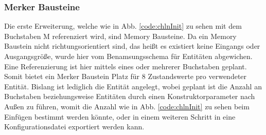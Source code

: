 \subsubsection{Merker Bausteine}
Die erste Erweiterung, welche wie in Abb. \ref{code:chlnInit} zu sehen mit dem Buchstaben M referenziert wird, sind Memory Bausteine. Da ein Memory Baustein nicht richtungsorientiert sind, das heißt es existiert keine Eingangs oder Ausgangsgröße, wurde hier vom Benamsungsschema für Entitäten  abgewichen. Eine Referenzierung ist hier mittels eines oder mehrerer Buchstaben geplant. Somit bietet ein Merker Baustein Platz für 8 Zustandswerte pro verwendeter Entität. Bislang ist lediglich die Entität  angelegt, wobei geplant ist die Anzahl an Buchstaben beziehungsweise Entitäten durch einen Konstruktorparameter nach Außen zu führen, womit die Anzahl wie in Abb. \ref{code:chlnInit} zu sehen beim Einfügen bestimmt werden könnte, oder in einem weiteren Schritt in eine Konfigurationsdatei exportiert werden kann. 


